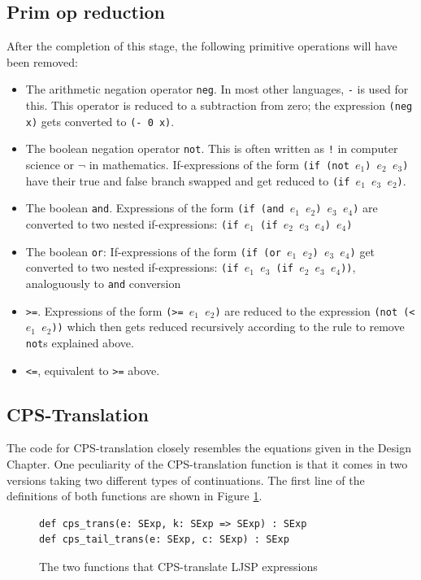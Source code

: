 \documentclass[11pt]{report}
\begin{document}
\subsection{Prim op reduction}
After the completion of this stage, the following primitive operations will have been removed: 
\begin{itemize}
\item The arithmetic negation operator \texttt{neg}. In most other languages, \texttt{-} is used for this. This operator is reduced to a subtraction from zero; the expression \texttt{(neg x)} gets converted to \texttt{(- 0 x)}.
\item The boolean negation operator \texttt{not}. This is often written as \texttt{!} in computer science or $\neg$ in mathematics. If-expressions of the form \texttt{(if (not $e_1$) $e_2$ $e_3$)} have their true and false branch swapped and get reduced to \texttt{(if $e_1$ $e_3$ $e_2$)}.
\item The boolean \texttt{and}. Expressions of the form \texttt{(if (and $e_1$ $e_2$) $e_3$ $e_4$)} are converted to two nested if-expressions: \texttt{(if $e_1$ (if $e_2$ $e_3$ $e_4$) $e_4$)}
\item The boolean \texttt{or}: If-expressions of the form \texttt{(if (or $e_1$ $e_2$) $e_3$ $e_4$)} get converted to two nested if-expressions: \texttt{(if $e_1$ $e_3$ (if $e_2$ $e_3$ $e_4$))}, analoguously to \texttt{and} conversion
\item \texttt{>=}. Expressions of the form \texttt{(>= $e_1$ $e_2$)} are reduced to the expression \texttt{(not (< $e_1$ $e_2$))} which then gets reduced recursively according to the rule to remove \texttt{not}s explained above.
\item \texttt{<=}, equivalent to \texttt{>=} above.
\end{itemize}

\subsection{CPS-Translation}
The code for CPS-translation closely resembles the equations given in the Design Chapter. One peculiarity of the CPS-translation function is that it comes in two versions taking two different types of continuations. The first line of the definitions of both functions are shown in Figure \ref{cpstranstwofuncs}.

\begin{figure}[ht]
\begin{lstlisting}
def cps_trans(e: SExp, k: SExp => SExp) : SExp
def cps_tail_trans(e: SExp, c: SExp) : SExp
\end{lstlisting}
\caption{The two functions that CPS-translate LJSP expressions}
\label{cpstranstwofuncs}
\end{figure}
\end{document}
